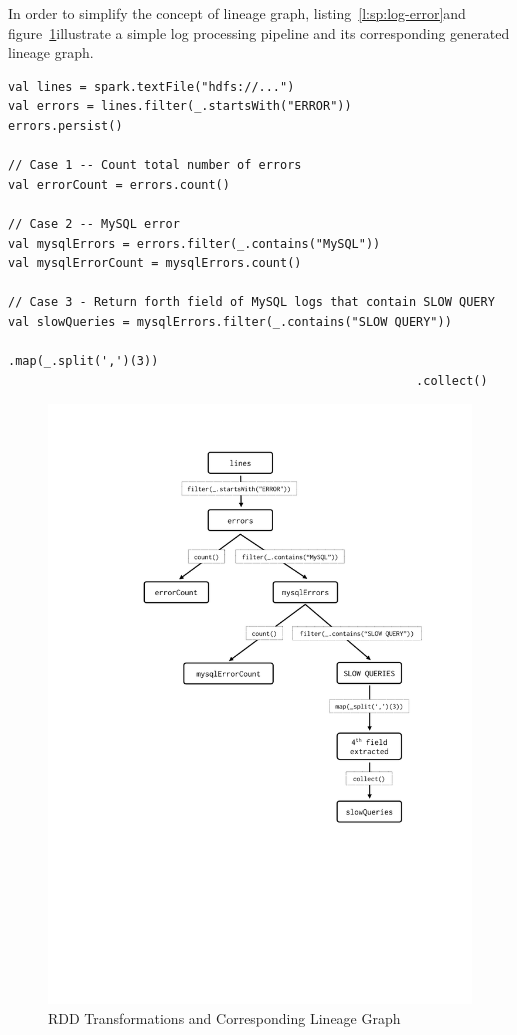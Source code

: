 In order to simplify the concept of lineage graph, listing~\ref{l:sp:log-error}\footnotemark and figure~\ref{fig:spark-lineage-sample}\footnotemark[\value{footnote}] illustrate a simple log processing pipeline and its corresponding generated lineage graph.
\begin{lstlisting}[float=h, caption={Parsing errors in log files from HDFS},label={l:sp:log-error},captionpos=b,morekeywords={val}]
val lines = spark.textFile("hdfs://...")
val errors = lines.filter(_.startsWith("ERROR"))
errors.persist()

// Case 1 -- Count total number of errors
val errorCount = errors.count()

// Case 2 -- MySQL error
val mysqlErrors = errors.filter(_.contains("MySQL"))
val mysqlErrorCount = mysqlErrors.count()

// Case 3 - Return forth field of MySQL logs that contain SLOW QUERY
val slowQueries = mysqlErrors.filter(_.contains("SLOW QUERY"))
                                                         .map(_.split(',')(3))
                                                         .collect()
\end{lstlisting}
\begin{figure}[p]
    \centering
    \includegraphics[clip,trim=4.5cm 9cm 2.2cm 2.2cm]{spark-lineage-sample.pdf}
    \caption[RDD Transformations and Corresponding Lineage Graph]{RDD Transformations and Corresponding Lineage Graph}
    \label{fig:spark-lineage-sample}
\end{figure}


